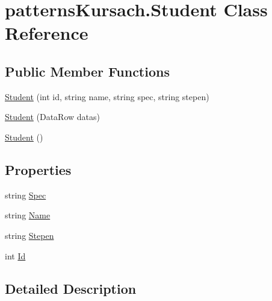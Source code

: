 \hypertarget{classpatterns_kursach_1_1_student}{}\section{patterns\+Kursach.\+Student Class Reference}
\label{classpatterns_kursach_1_1_student}
\subsection*{Public Member Functions}
\begin{DoxyCompactItemize}
\item 
\mbox{\hyperlink{classpatterns_kursach_1_1_student_ab7bf302da763ef12015e8943ec233c7c}{Student}} (int id, string name, string spec, string stepen)
\item 
\mbox{\hyperlink{classpatterns_kursach_1_1_student_aa012a5120419833a128fafb8a8755c6b}{Student}} (Data\+Row datas)
\item 
\mbox{\hyperlink{classpatterns_kursach_1_1_student_a597e81962cbb7e16d391e515a07e1df6}{Student}} ()
\end{DoxyCompactItemize}
\subsection*{Properties}
\begin{DoxyCompactItemize}
\item 
string \mbox{\hyperlink{classpatterns_kursach_1_1_student_aaf96519bff25150a3ea2304c22f1cd40}{Spec}}
\item 
string \mbox{\hyperlink{classpatterns_kursach_1_1_student_abbd331b9b1f5542c08434487e2dcac81}{Name}}
\item 
string \mbox{\hyperlink{classpatterns_kursach_1_1_student_ac1d80f7fe47b9814382d25f416f68192}{Stepen}}
\item 
int \mbox{\hyperlink{classpatterns_kursach_1_1_student_a8c20b8105aa12679f00252f5f6009ae6}{Id}}
\end{DoxyCompactItemize}


\subsection{Detailed Description}


